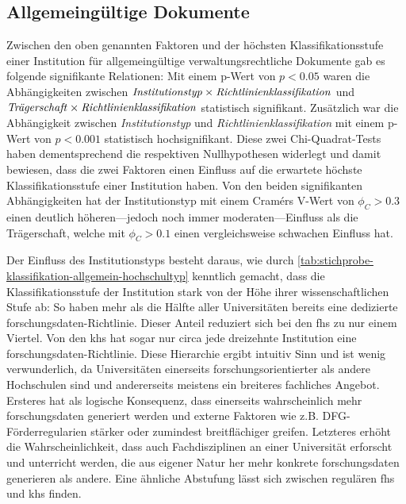 \subsection{Allgemeingültige Dokumente}\label{sec:policy-discussion-general}
Zwischen den oben genannten Faktoren und der höchsten Klassifikationsstufe einer Institution für allgemeingültige verwaltungsrechtliche Dokumente gab es folgende signifikante Relationen:
Mit einem p-Wert von $p<\num{0,05}$ waren die Abhängigkeiten zwischen $\text{\textit{Institutionstyp}}\times\text{\textit{Richtlinienklassifikation}}$ und $\text{\textit{Trägerschaft}}\times\text{\textit{Richtlinienklassifikation}}$ statistisch signifikant.
Zusätzlich war die Abhängigkeit zwischen \textit{Institutionstyp} und \textit{Richtlinienklassifikation} mit einem p-Wert von $p<\num{0,001}$ statistisch hochsignifikant.
Diese zwei Chi-Quadrat-Tests haben dementsprechend die respektiven Nullhypothesen widerlegt und damit bewiesen, dass die zwei Faktoren einen Einfluss auf die erwartete höchste Klassifikationsstufe einer Institution haben.
Von den beiden signifikanten Abhängigkeiten hat der Institutionstyp mit einem Cramérs V-Wert von $\phi_C>\num{0.3}$ einen deutlich höheren---jedoch noch immer moderaten---Einfluss als die Trägerschaft, welche mit $\phi_C>\num{0.1}$ einen vergleichsweise schwachen Einfluss hat.

Der Einfluss des Institutionstyps besteht daraus, wie durch \cref{tab:stichprobe-klassifikation-allgemein-hochschultyp} kenntlich gemacht, dass die Klassifikationsstufe der Institution stark von der Höhe ihrer wissenschaftlichen Stufe ab:
So haben mehr als die Hälfte aller Universitäten bereits eine dedizierte \gls{forschungsdaten}-Richtlinie. 
Dieser Anteil reduziert sich bei den \glspl{fh} zu nur einem Viertel.
Von den \glspl{kh} hat sogar nur circa jede dreizehnte Institution eine \gls{forschungsdaten}-Richtlinie.
Diese Hierarchie ergibt intuitiv Sinn und ist wenig verwunderlich, da Universitäten einerseits forschungsorientierter als andere Hochschulen sind und andererseits meistens ein breiteres fachliches Angebot.
Ersteres hat als logische Konsequenz, dass einerseits wahrscheinlich mehr \gls{forschungsdaten} generiert werden und externe Faktoren wie z.B. DFG-Förderregularien stärker oder zumindest breitflächiger greifen.
Letzteres erhöht die Wahrscheinlichkeit, dass auch Fachdisziplinen an einer Universität erforscht und unterricht werden, die aus eigener Natur her mehr konkrete \gls{forschungsdaten} generieren als andere.
Eine ähnliche Abstufung lässt sich zwischen regulären \glspl{fh} und \glspl{kh} finden.

